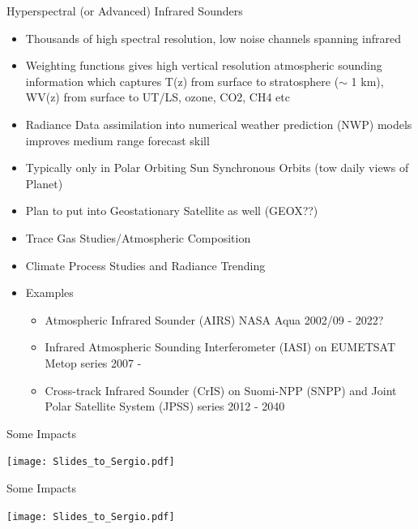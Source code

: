 \documentclass[10pt,t]{beamer}
\begin{document}
\begin{frame}[shrink=2]{Hyperspectral (or Advanced) Infrared Sounders}
\begin{itemize}
  \item Thousands of high spectral resolution, low noise channels spanning infrared
  \item Weighting functions gives high vertical resolution atmospheric sounding information which captures 
         T(z) from surface to stratosphere ($\sim$ 1 km), WV(z) from surface to UT/LS, ozone, CO2, CH4 etc
  \item Radiance Data assimilation into numerical weather prediction (NWP) models improves medium range forecast skill
  \item Typically only in Polar Orbiting Sun Synchronous Orbits (tow daily views of Planet)
  \item Plan to put into Geostationary Satellite as well (GEOX??)
  \item Trace Gas Studies/Atmospheric Composition
  \item Climate Process Studies and Radiance Trending
  \item Examples
  \begin{itemize}
    \item Atmospheric Infrared Sounder (AIRS) NASA Aqua 2002/09 - 2022?
    \item Infrared Atmospheric Sounding Interferometer (IASI) on EUMETSAT Metop series 2007 - 
    \item Cross-track Infrared Sounder (CrIS) on Suomi-NPP (SNPP) and Joint Polar Satellite System (JPSS) series 2012 - 2040
  \end{itemize}
\end{itemize}
\end{frame}

\begin{frame}{Some Impacts}
\vspace{-0.35in}
\begin{center}
\texttt{[image: Slides\_to\_Sergio.pdf]}
\end{center}
\end{frame}

\begin{frame}{Some Impacts}
\vspace{-0.35in}
\begin{center}
\texttt{[image: Slides\_to\_Sergio.pdf]}
\end{center}
\end{frame}
\end{document}
